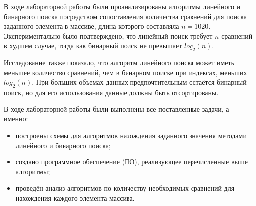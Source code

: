 
В ходе лабораторной работы были проанализированы алгоритмы линейного и бинарного поиска посредством сопоставления количества сравнений для поиска заданного элемента в массиве, длина которого составляла $n = 1020$. Экспериментально было подтверждено, что линейный поиск требует $n$ сравнений в худшем случае, тогда как бинарный поиск не превышает $log_2(n)$.

Исследование также показало, что алгоритм линейного поиска может иметь меньшее количество сравнений, чем в бинарном поиске при индексах, меньших $log_2(n)$. При больших объемах данных предпочтительным остаётся бинарный поиск, но для его использования данные должны быть отсортированы.

В ходе лабораторной работы были выполнены все поставленные задачи, а именно:
    \begin{itemize}
    \item построены схемы для алгоритмов нахождения заданного значения методами линейного и бинарного поиска;
    \item создано программное обеспечение (ПО), реализующее перечисленные выше алгоритмы;
    \item проведён анализ алгоритмов по количеству необходимых сравнений для нахождения каждого элемента массива.
\end{itemize}

